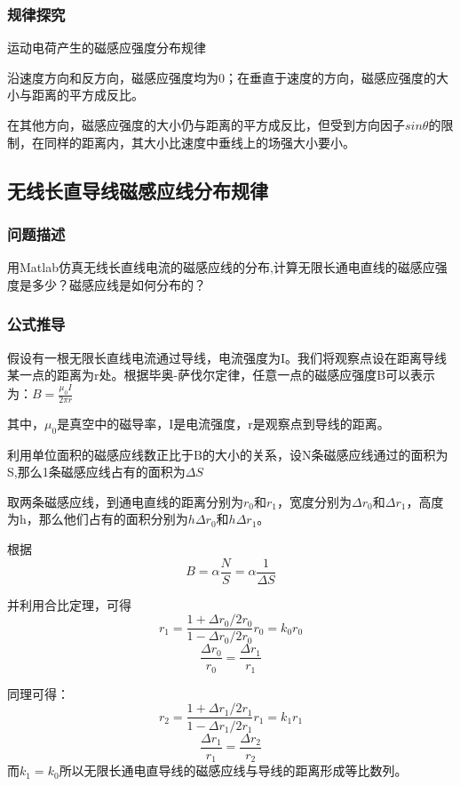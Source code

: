 \documentclass[UTF8]{article}
\numberwithin{figure}{subsection}
\numberwithin{table}{subsection}
\begin{document}
\begin{multicols}{2}
	\subsubsection{规律探究}
	\par 运动电荷产生的磁感应强度分布规律
	\par 沿速度方向和反方向，磁感应强度均为0；在垂直于速度的方向，磁感应强度的大小与距离的平方成反比。
	\par 在其他方向，磁感应强度的大小仍与距离的平方成反比，但受到方向因子$sin\theta$的限制，在同样的距离内，其大小比速度中垂线上的场强大小要小。
	\subsection{无线长直导线磁感应线分布规律}
	\subsubsection{问题描述}
	\par 用Matlab仿真无线长直线电流的磁感应线的分布,计算无限长通电直线的磁感应强度是多少？磁感应线是如何分布的？
	\subsubsection{公式推导}
	\par 假设有一根无限长直线电流通过导线，电流强度为I。我们将观察点设在距离导线某一点的距离为r处。根据毕奥-萨伐尔定律，任意一点的磁感应强度B可以表示为：$B = \frac{\mu_0 I}{2\pi r}$
	\par 其中，$\mu_0$是真空中的磁导率，I是电流强度，r是观察点到导线的距离。
	\par 利用单位面积的磁感应线数正比于B的大小的关系，设N条磁感应线通过的面积为S,那么1条磁感应线占有的面积为$\Delta S$
	\par 取两条磁感应线，到通电直线的距离分别为$r_0$和$r_1$，宽度分别为$\Delta r_0$和$\Delta r_1$，高度为h，那么他们占有的面积分别为$h\Delta r_0$和$h\Delta r_1$。
	\par 根据
	$$B=\alpha \frac{N}{S}=\alpha \frac{1}{\Delta S}$$
	\par 并利用合比定理，可得
	$$r_1=\frac{1+\Delta r_0/2r_0}{1-\Delta r_0/2r_0} r_0=k_0 r_0$$
	$$\frac{\Delta r_0}{r_0}=\frac{\Delta r_1}{r_1}$$
	\par 同理可得：
	$$r_2=\frac{1+\Delta r_1/2r_1}{1-\Delta r_1/2r_1} r_1=k_1 r_1$$
	$$\frac{\Delta r_1}{r_1}=\frac{\Delta r_2}{r_2}$$
	而$k_1=k_0$所以无限长通电直导线的磁感应线与导线的距离形成等比数列。

\end{multicols}
\end{document}
